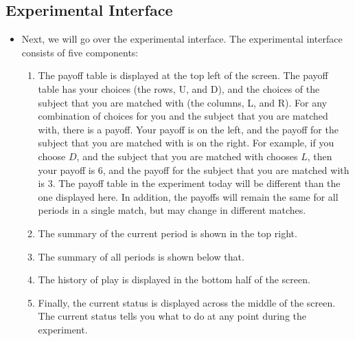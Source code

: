 \documentclass[11pt]{article}
\newcommand{\dblbkt}[1]{}
\begin{document}
\subsection*{\dblbkt{5} Experimental Interface}
\begin{itemize}
\item Next, we will go over the experimental interface.  The experimental interface consists of five components: 
\begin{enumerate} 
\item \dblbkt{2} The payoff table is displayed at the top left of the screen.  The payoff table has your choices (the rows, \dblbkt{1} U, and \dblbkt{1} D), and the choices of the subject that you are matched with (the columns,\dblbkt{1} L, and \dblbkt{1} R).  For any combination of choices for you and the subject that you are matched with, there is a payoff.  Your payoff is on the left, and the payoff for the subject that you are matched with is on the right.  For example, if you \dblbkt{1} choose $D$, and the subject that you are matched with \dblbkt{1} chooses $L$, \dblbkt{1} then your payoff is 6, and the payoff for the subject that you are matched with is 3.  The payoff table in the experiment today will be different than the one displayed here.  In addition, the payoffs will remain the same for all periods in a single match, but may change in different matches.
\item \dblbkt{3} The summary of the current period is shown in the top right. 
\item \dblbkt{1} The summary of all periods is shown below that.
\item \dblbkt{4} The history of play is displayed in the bottom half of the screen.
\item \dblbkt{4} Finally, the current status is displayed across the middle of the screen.  The current status tells you what to do at any point during the experiment.
\end{enumerate} 
\end{itemize}
\end{document}
